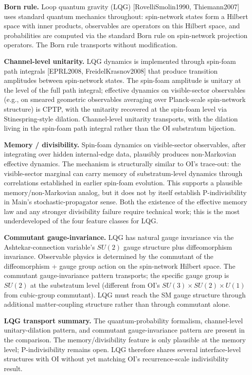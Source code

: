 \documentclass[
]{article}
\begin{document}
\textbf{Born rule.} Loop quantum gravity (LQG) {[}RovelliSmolin1990,
Thiemann2007{]} uses standard quantum mechanics throughout: spin-network
states form a Hilbert space with inner products, observables are
operators on this Hilbert space, and probabilities are computed via the
standard Born rule on spin-network projection operators. The Born rule
transports without modification.

\textbf{Channel-level unitarity.} LQG dynamics is implemented through
spin-foam path integrals {[}EPRL2008, FreidelKrasnov2008{]} that produce
transition amplitudes between spin-network states. The spin-foam
amplitude is unitary at the level of the full path integral; effective
dynamics on visible-sector observables (e.g., on smeared geometric
observables averaging over Planck-scale spin-network structure) is CPTP,
with the unitarity recovered at the spin-foam level via
Stinespring-style dilation. Channel-level unitarity transports, with the
dilation living in the spin-foam path integral rather than the OI
substratum bijection.

\textbf{Memory / divisibility.} Spin-foam dynamics on visible-sector
observables, after integrating over hidden internal-edge data, plausibly
produces non-Markovian effective dynamics. The mechanism is structurally
similar to OI's trace-out: the visible-sector marginal can carry memory
of substratum-level dynamics through correlations established in earlier
spin-foam evolution. This supports a plausible memory/non-Markovian
analog, but it does not by itself establish P-indivisibility in Main's
stochastic-propagator sense. Both the existence of the effective memory
law and any stronger divisibility failure require technical work; this
is the most underdeveloped of the four feature classes for LQG.

\textbf{Commutant gauge-invariance.} LQG has natural gauge invariance
via the Ashtekar-connection variable's \(SU(2)\) gauge structure plus
diffeomorphism invariance. Observable physics is determined by the
commutant of the diffeomorphism + gauge group action on the spin-network
Hilbert space. The commutant gauge-invariance pattern transports; the
specific gauge group is \(SU(2)\) at the substratum level (different
from OI's \(SU(3) \times SU(2) \times U(1)\) from cubic-group
commutant). LQG must reach the SM gauge structure through additional
matter-coupling structure rather than through commutant alone.

\textbf{LQG transport summary.} The quantum-probability formalism,
channel-level unitary-dilation pattern, and commutant gauge-invariance
pattern are present in the comparison. The memory/divisibility feature
is only plausible at the memory level; P-indivisibility remains open.
LQG therefore shares several interface-level structures with OI without
yet matching OI's recurrence-scale indivisibility result.
\end{document}
